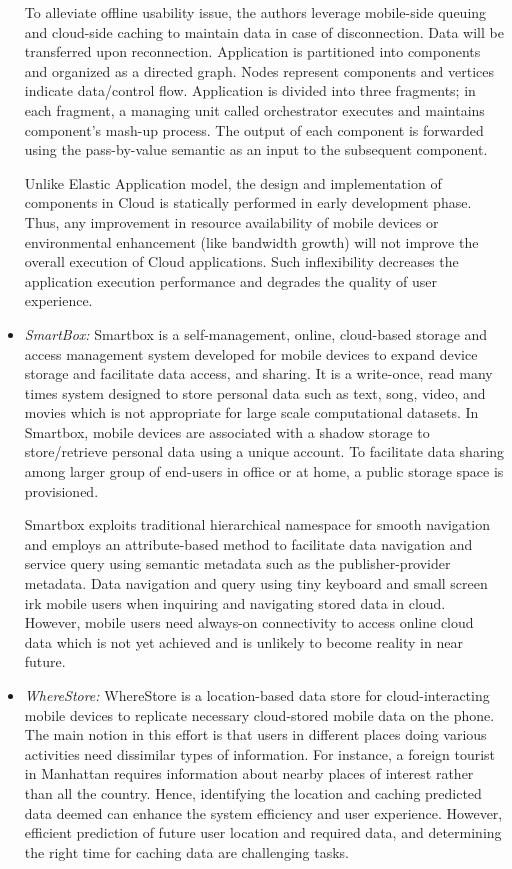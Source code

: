 \documentclass[publish]{IEEEtran}
\begin{document}
\begin{itemize}
To alleviate offline usability issue, the authors leverage mobile-side queuing and cloud-side caching to maintain data in case of disconnection. Data will be transferred upon reconnection. Application is partitioned into components and organized as a directed graph. Nodes represent components and vertices indicate data/control flow.  Application is divided into three fragments; in each fragment, a managing unit called orchestrator executes and maintains component's mash-up process. The output of each component is forwarded using the pass-by-value semantic as an input to the subsequent component. 

Unlike Elastic Application model, the design and implementation of components in Cloud is statically performed in early development phase. Thus, any improvement in resource availability of mobile devices or environmental enhancement (like bandwidth growth) will not improve the overall execution of Cloud applications. Such inflexibility decreases the application execution performance and degrades the quality of user experience.

\item \textit{SmartBox:}
Smartbox \cite{Zheng2010} is a self-management, online, cloud-based storage and access management system developed for mobile devices to expand device storage and facilitate data access, and sharing. It is a write-once, read many times system designed to store personal data such as text, song, video, and movies which is not appropriate for large scale computational datasets. In Smartbox, mobile devices are associated with a shadow storage to store/retrieve personal data using a unique account. To facilitate data sharing among larger group of end-users in office or at home, a public storage space is provisioned.

Smartbox exploits traditional hierarchical namespace for smooth navigation and employs an attribute-based method to facilitate data navigation and service query using semantic metadata such as the publisher-provider metadata. Data navigation and query using tiny keyboard and small screen irk mobile users when inquiring and navigating stored data in cloud. However, mobile users need always-on connectivity to access online cloud data which is not yet achieved and is unlikely to become reality in near future. 

\item \textit{WhereStore:}
WhereStore \cite{Stuedi2010} is a location-based data store for cloud-interacting mobile devices to replicate necessary cloud-stored mobile data on the phone. The main notion in this effort is that users in different places doing various activities need dissimilar types of information. For instance, a foreign tourist in Manhattan requires information about nearby places of interest rather than all the country. Hence, identifying the location and caching predicted data deemed can enhance the system efficiency and user experience. However, efficient prediction of future user location and required data, and determining the right time for caching data are challenging tasks.


\end{itemize}
\end{document}
